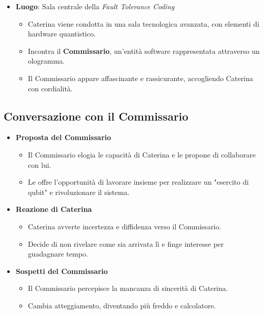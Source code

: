 \begin{itemize}
    \item \textbf{Luogo}: Sala centrale della \emph{Fault Tolerance Coding}
    \begin{itemize}
        \item Caterina viene condotta in una sala tecnologica avanzata, con elementi di hardware quantistico.
        \item Incontra il \textbf{Commissario}, un'entità software rappresentata attraverso un ologramma.
        \item Il Commissario appare affascinante e rassicurante, accogliendo Caterina con cordialità.
    \end{itemize}
\end{itemize}

\subsection*{Conversazione con il Commissario}

\begin{itemize}
    \item \textbf{Proposta del Commissario}
    \begin{itemize}
        \item Il Commissario elogia le capacità di Caterina e le propone di collaborare con lui.
        \item Le offre l'opportunità di lavorare insieme per realizzare un "esercito di qubit" e rivoluzionare il sistema.
    \end{itemize}

    \item \textbf{Reazione di Caterina}
    \begin{itemize}
        \item Caterina avverte incertezza e diffidenza verso il Commissario.
        \item Decide di non rivelare come sia arrivata lì e finge interesse per guadagnare tempo.
    \end{itemize}

    \item \textbf{Sospetti del Commissario}
    \begin{itemize}
        \item Il Commissario percepisce la mancanza di sincerità di Caterina.
        \item Cambia atteggiamento, diventando più freddo e calcolatore.
    \end{itemize}
\end{itemize}

